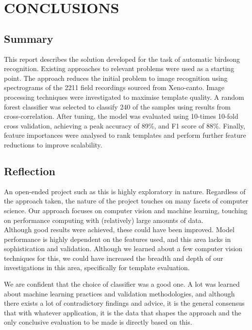 \chapter{CONCLUSIONS}

%
%

\section{Summary}
This report describes the solution developed for the task of automatic birdsong
recognition.
Existing approaches to relevant problems were used as a starting point.
The approach reduces the initial problem to image recognition using spectrograms
of the 2211 field recordings sourced from Xeno-canto.
Image processing techniques were investigated to maximise template quality.
A random forest classifier was selected to classify 240 of the samples using
results from cross-correlation.
After tuning, the model was evaluated using 10-times 10-fold cross validation, 
achieving a peak accuracy of 89\%, and F1 score of 88\%.
Finally, feature importances were analysed to rank templates and perform further
feature reductions to improve scalability.

\section{Reflection}
An open-ended project such as this is highly exploratory in nature.
Regardless of the approach taken, the nature of the project touches on many
facets of computer science.
Our approach focuses on computer vision and machine learning, touching on
performance computing with (relatively) large amounts of data.\\

Although good results were achieved, these could have been improved.
Model performance is highly dependent on the features used, and this area
lacks in sophistication and validation.
Although we learned about a few computer vision techniques for this, we could
have increased the breadth and depth of our investigations in this area,
specifically for template evaluation.

We are confident that the choice of classifier was a good one.
A lot was learned about machine learning practices and validation methodologies,
and although there exists
a lot of contradictory findings and advice, it is the general consensus that
with whatever application, it is the data that shapes the approach and the only
conclusive evaluation to be made is directly based on this.


